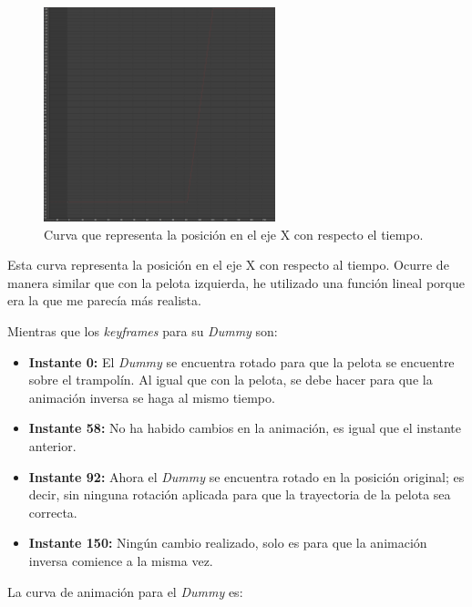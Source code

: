 \documentclass{article}
\begin{document}
 \begin{figure}[H]
    \centering
    \includegraphics[width=0.6\textwidth]{imagenes/curvas/PR/pelota/red.png}
    \caption{Curva que representa la posición en el eje X con respecto el tiempo.}
 \end{figure}

Esta curva representa la posición en el eje X con respecto al tiempo. Ocurre de manera similar que con la pelota izquierda, he utilizado una función lineal porque era la que me parecía más realista.

\newpage

Mientras que los \textit{keyframes} para su \textit{Dummy} son:

\begin{itemize}
    \item \textbf{Instante 0: }El \textit{Dummy} se encuentra rotado para que la pelota se encuentre sobre el trampolín. Al igual que con la pelota, se debe hacer para que la animación inversa se haga al mismo tiempo.
    \item \textbf{Instante 58: }No ha habido cambios en la animación, es igual que el instante anterior.
    \item \textbf{Instante 92: }Ahora el \textit{Dummy} se encuentra rotado en la posición original; es decir, sin ninguna rotación aplicada para que la trayectoria de la pelota sea correcta.
    \item \textbf{Instante 150: }Ningún cambio realizado, solo es para que la animación inversa comience a la misma vez.
\end{itemize}

\bigskip

La curva de animación para el \textit{Dummy} es:
\end{document}

